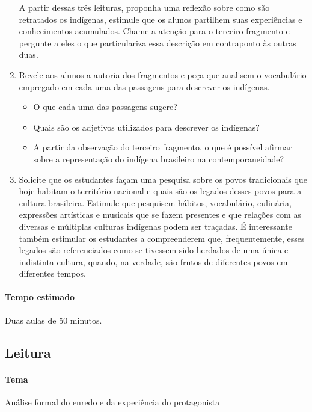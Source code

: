 \documentclass[12pt]{extarticle}
\begin{document}
\begin{enumerate}
A partir dessas três leituras, proponha uma reflexão sobre como são
retratados os indígenas, estimule que os alunos partilhem suas
experiências e conhecimentos acumulados. Chame a atenção para o
terceiro fragmento e pergunte a eles o que particulariza essa
descrição em contraponto às outras duas.

\item Revele aos alunos a autoria dos fragmentos e peça que analisem o
vocabulário empregado em cada uma das passagens para descrever os
indígenas.

\begin{itemize}
\item
  O que cada uma das passagens sugere?
\item
  Quais são os adjetivos utilizados para descrever os indígenas?
\item
  A partir da observação do terceiro fragmento, o que é possível afirmar
  sobre a representação do indígena brasileiro na contemporaneidade?
\end{itemize}

\item Solicite que os estudantes façam uma pesquisa sobre os povos
tradicionais que hoje habitam o território nacional e quais são os
legados desses povos para a cultura brasileira. Estimule que
pesquisem hábitos, vocabulário, culinária, expressões artísticas e
musicais que se fazem presentes e que relações com as diversas e
múltiplas culturas indígenas podem ser traçadas. É interessante
também estimular os estudantes a compreenderem que, frequentemente,
esses legados são referenciados como se tivessem sido herdados de
uma única e indistinta cultura, quando, na verdade, são frutos de
diferentes povos em diferentes tempos.

\end{enumerate}

\paragraph{Tempo estimado} Duas aulas de 50 minutos.

\subsection{Leitura}

\paragraph{Tema} Análise formal do enredo e da experiência do protagonista
  
\end{document}

